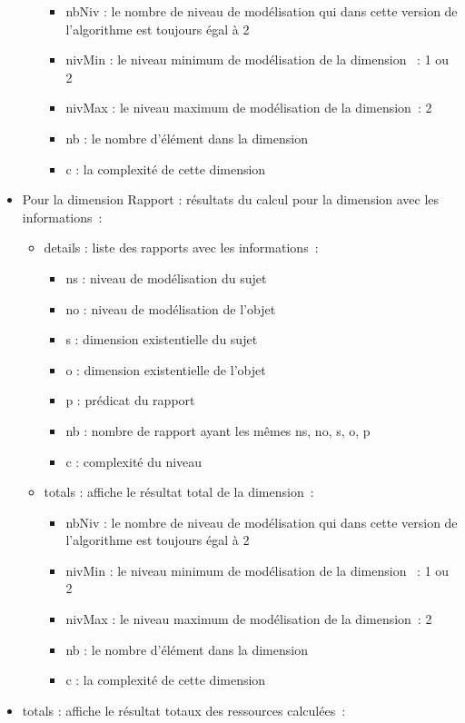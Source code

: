 \documentclass[
  a4paper,
  DIV=11,
  numbers=noendperiod]{scrreprt}
\providecommand{\tightlist}{%
  \setlength{\itemsep}{0pt}\setlength{\parskip}{0pt}}\usepackage{longtable,booktabs,array}
\begin{document}
\begin{itemize}
\begin{itemize}
    \begin{itemize}
    \tightlist
    \item
      nbNiv : le nombre de niveau de modélisation qui dans cette version
      de l'algorithme est toujours égal à 2
    \item
      nivMin : le niveau minimum de modélisation de la dimension ~: 1 ou
      2
    \item
      nivMax : le niveau maximum de modélisation de la dimension~: 2
    \item
      nb : le nombre d'élément dans la dimension
    \item
      c : la complexité de cette dimension
    \end{itemize}
  \end{itemize}
\item
  Pour la dimension Rapport : résultats du calcul pour la dimension avec
  les informations~:

  \begin{itemize}
  \item
    details : liste des rapports avec les informations~:

    \begin{itemize}
    \tightlist
    \item
      ns : niveau de modélisation du sujet
    \item
      no : niveau de modélisation de l'objet
    \item
      s : dimension existentielle du sujet
    \item
      o : dimension existentielle de l'objet
    \item
      p : prédicat du rapport
    \item
      nb : nombre de rapport ayant les mêmes ns, no, s, o, p
    \item
      c : complexité du niveau
    \end{itemize}
  \item
    totals : affiche le résultat total de la dimension~:

    \begin{itemize}
    \tightlist
    \item
      nbNiv : le nombre de niveau de modélisation qui dans cette version
      de l'algorithme est toujours égal à 2
    \item
      nivMin : le niveau minimum de modélisation de la dimension ~: 1 ou
      2
    \item
      nivMax : le niveau maximum de modélisation de la dimension~: 2
    \item
      nb : le nombre d'élément dans la dimension
    \item
      c : la complexité de cette dimension
    \end{itemize}
  \end{itemize}
\item
  totals : affiche le résultat totaux des ressources calculées~:


\end{itemize}
\end{document}
